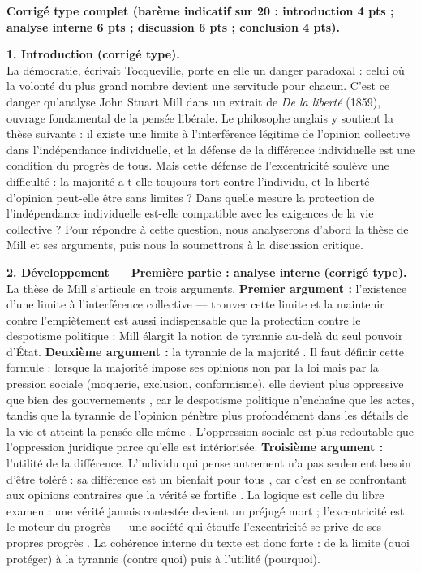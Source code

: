 \documentclass[11pt]{article}
\begin{document}
\begin{exoresolu}
\textbf{Corrigé type complet (barème indicatif sur 20 : introduction 4 pts ; analyse interne 6 pts ; discussion 6 pts ; conclusion 4 pts).}

\textbf{1. Introduction (corrigé type).}\\
\og La démocratie, écrivait Tocqueville, porte en elle un danger paradoxal : celui où la volonté du plus grand nombre devient une servitude pour chacun. C'est ce danger qu'analyse John Stuart Mill dans un extrait de \emph{De la liberté} (1859), ouvrage fondamental de la pensée libérale. Le philosophe anglais y soutient la thèse suivante : il existe une limite à l'interférence légitime de l'opinion collective dans l'indépendance individuelle, et la défense de la différence individuelle est une condition du progrès de tous. Mais cette défense de l'excentricité soulève une difficulté : la majorité a-t-elle toujours tort contre l'individu, et la liberté d'opinion peut-elle être sans limites ? Dans quelle mesure la protection de l'indépendance individuelle est-elle compatible avec les exigences de la vie collective ? Pour répondre à cette question, nous analyserons d'abord la thèse de Mill et ses arguments, puis nous la soumettrons à la discussion critique. \fg

\textbf{2. Développement — Première partie : analyse interne (corrigé type).}\\
La thèse de Mill s'articule en trois arguments. \textbf{Premier argument :} l'existence d'une limite à l'interférence collective — \og trouver cette limite et la maintenir contre l'empiètement \fg est aussi indispensable que la protection contre le despotisme politique : Mill élargit la notion de tyrannie au-delà du seul pouvoir d'État. \textbf{Deuxième argument :} la \og tyrannie de la majorité \fg. Il faut définir cette formule : lorsque la majorité impose ses opinions non par la loi mais par la pression sociale (moquerie, exclusion, conformisme), elle devient \og plus oppressive que bien des gouvernements \fg, car le despotisme politique n'enchaîne que les actes, tandis que la tyrannie de l'opinion \og pénètre plus profondément dans les détails de la vie \fg et atteint \og la pensée elle-même \fg. L'oppression sociale est plus redoutable que l'oppression juridique parce qu'elle est intériorisée. \textbf{Troisième argument :} l'utilité de la différence. L'individu qui pense autrement \og n'a pas seulement besoin d'être toléré : sa différence est un bienfait pour tous \fg, car \og c'est en se confrontant aux opinions contraires que la vérité se fortifie \fg. La logique est celle du libre examen : une vérité jamais contestée devient un préjugé mort ; l'excentricité est le moteur du progrès — \og une société qui étouffe l'excentricité se prive de ses propres progrès \fg. La cohérence interne du texte est donc forte : de la limite (quoi protéger) à la tyrannie (contre quoi) puis à l'utilité (pourquoi).


\end{exoresolu}
\end{document}
